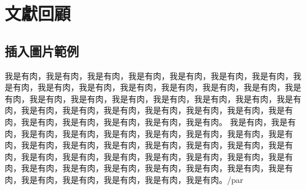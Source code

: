 \chapter{文獻回顧}

\section{插入圖片範例}

我是有肉，我是有肉，我是有肉，我是有肉，我是有肉，我是有肉，我是有肉，我是有肉，我是有肉，我是有肉，我是有肉，我是有肉，我是有肉，我是有肉，我是有肉，我是有肉，我是有肉，我是有肉，我是有肉，我是有肉，我是有肉，我是有肉，我是有肉，我是有肉，我是有肉，我是有肉，我是有肉，我是有肉，我是有肉，我是有肉，我是有肉，我是有肉，我是有肉，我是有肉。
我是有肉，我是有肉，我是有肉，我是有肉，我是有肉，我是有肉，我是有肉，我是有肉，我是有肉，我是有肉，我是有肉，我是有肉，我是有肉，我是有肉，我是有肉，我是有肉，我是有肉，我是有肉，我是有肉，我是有肉，我是有肉，我是有肉，我是有肉，我是有肉，我是有肉，我是有肉，我是有肉，我是有肉，我是有肉，我是有肉，我是有肉，我是有肉，我是有肉，我是有肉，我是有肉。/par


















































